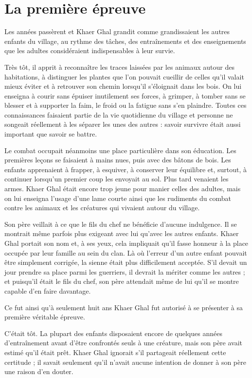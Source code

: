\chapter{La première épreuve}
\label{chap:premiere-epreuve}

Les années passèrent et Khaer Ghal grandit comme grandissaient les autres
enfants du village, au rythme des tâches, des entraînements et des
enseignements que les adultes considéraient indispensables à leur survie.

Très tôt, il apprit à reconnaître les traces laissées par les animaux autour
des habitations, à distinguer les plantes que l'on pouvait cueillir de celles
qu'il valait mieux éviter et à retrouver son chemin lorsqu'il s'éloignait dans
les bois. On lui enseigna à courir sans épuiser inutilement ses forces, à
grimper, à tomber sans se blesser et à supporter la faim, le froid ou la
fatigue sans s'en plaindre. Toutes ces connaissances faisaient partie de la
vie quotidienne du village et personne ne songeait réellement à les séparer
les unes des autres : savoir survivre était aussi important que savoir se
battre.

Le combat occupait néanmoins une place particulière dans son éducation. Les
premières leçons se faisaient à mains nues, puis avec des bâtons de bois. Les
enfants apprenaient à frapper, à esquiver, à conserver leur équilibre et,
surtout, à continuer lorsqu'un premier coup les envoyait au sol. Plus tard
venaient les armes. Khaer Ghal était encore trop jeune pour manier celles des
adultes, mais on lui enseigna l'usage d'une lame courte ainsi que les rudiments
du combat contre les animaux et les créatures qui vivaient autour du village.

Son père veillait à ce que le fils du chef ne bénéficie d'aucune indulgence.
Il se montrait même parfois plus exigeant avec lui qu'avec les autres enfants.
Khaer Ghal portait son nom et, à ses yeux, cela impliquait qu'il fasse honneur
à la place occupée par leur famille au sein du clan. Là où l'erreur d'un autre
enfant pouvait être simplement corrigée, la sienne était plus difficilement
acceptée. S'il devait un jour prendre sa place parmi les guerriers, il devrait
la mériter comme les autres ; et puisqu'il était le fils du chef, son père
attendait même de lui qu'il se montre capable d'en faire davantage.

Ce fut ainsi qu'à seulement huit ans Khaer Ghal fut autorisé à se présenter à
sa première véritable épreuve.

C'était tôt. La plupart des enfants disposaient encore de quelques années
d'entraînement avant d'être confrontés seuls à une créature, mais son père
avait estimé qu'il était prêt. Khaer Ghal ignorait s'il partageait réellement
cette certitude ; il savait seulement qu'il n'avait aucune intention de donner
à son père une raison d'en douter.

